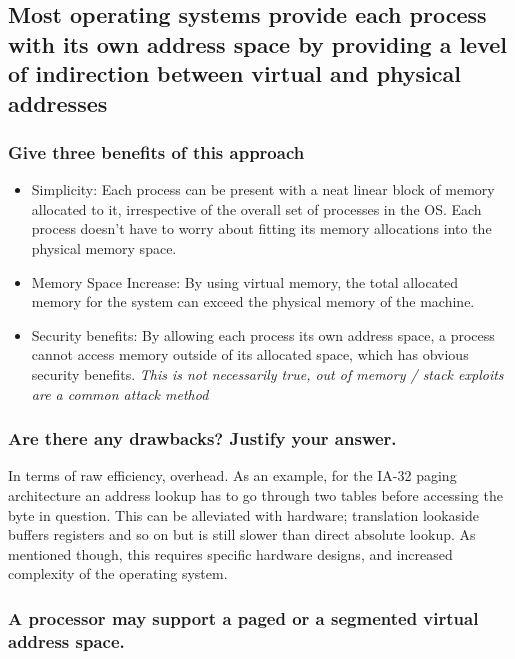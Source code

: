 \documentclass[]{article}
\begin{document}
    \subsection{Most operating systems provide each process with its own address space by providing a level of indirection between virtual and physical addresses}

        \subsubsection{Give three benefits of this approach}

         \begin{itemize}
            \item Simplicity: Each process can be present with a neat linear block of memory allocated to it, irrespective of the overall set of processes in the OS. Each process doesn't have to worry about fitting its memory allocations into the physical memory space.
            \item Memory Space Increase: By using virtual memory, the total allocated memory for the system can exceed the physical memory of the machine.
            \item Security benefits: By allowing each process its own address space, a process cannot access memory outside of its allocated space, which has obvious security benefits. \textit{This is not necessarily true, out of memory / stack exploits are a common attack method}
        \end{itemize}

        \subsubsection{Are there any drawbacks? Justify your answer.}

            In terms of raw efficiency, overhead. As an example, for the IA-32 paging architecture an address lookup has to go through two tables before accessing the byte in question. This can be alleviated with hardware; translation lookaside buffers registers and so on but is still slower than direct absolute lookup. As mentioned though, this requires specific hardware designs, and increased complexity of the operating system.

        \subsubsection{A processor may support a paged or a segmented virtual address space.}
\end{document}
